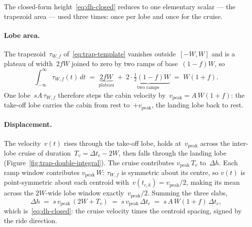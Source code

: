 \documentclass[manuscript,review,screen]{acmart}
\begin{document}
The closed-form height~\eqref{eq:dh-closed} reduces to one
elementary scalar — the trapezoid area — used three times: once
per lobe and once for the cruise.

\paragraph{Lobe area.}
The trapezoid~$\tau_{W,f}$ of~\eqref{eq:trap-template} vanishes
outside~$[-W,W]$ and is a plateau of width~$2fW$ joined to zero by
two ramps of base~$(1-f)W$, so
\begin{equation}
  \int_{-\infty}^{\infty}\!\tau_{W,f}(t)\,dt
   \;=\;\underbrace{2fW}_{\text{plateau}}
        \;+\;\underbrace{2\cdot\tfrac12(1-f)W}_{\text{two ramps}}
   \;=\;W(1+f).
  \label{eq:trap-area}
\end{equation}
One lobe~$sA\,\tau_{W,f}$ therefore steps the cabin velocity
by~$v_{\mathrm{peak}}\!=\!A\,W(1+f)$: the take-off lobe carries the
cabin from rest to~$+v_{\mathrm{peak}}$, the landing lobe back to rest.

\paragraph{Displacement.}
The velocity~$v(t)$ rises through the take-off lobe, holds
at~$v_{\mathrm{peak}}$ across the inter-lobe cruise of
duration~$T_v\!=\!\Delta t_c\!-\!2W$, then falls through the landing
lobe (Figure~\ref{fig:trap-double-integral}).  The cruise contributes
$v_{\mathrm{peak}}\,T_v$ to~$\Delta h$.  Each ramp window contributes
$v_{\mathrm{peak}}\,W$: $\tau_{W,f}$ is symmetric about its centre, so
$v(t)$ is point-symmetric about each centroid
with~$v(t_{c,k})\!=\!v_{\mathrm{peak}}/2$, making its mean across the
$2W$-wide lobe window exactly~$v_{\mathrm{peak}}/2$.  Summing the
three slabs,
\[
  \Delta h \;=\; s\,v_{\mathrm{peak}}\,(2W+T_v)
            \;=\; s\,v_{\mathrm{peak}}\,\Delta t_c
            \;=\; s\,A\,W(1+f)\,\Delta t_c,
\]
which is~\eqref{eq:dh-closed}: the cruise velocity times the centroid
spacing, signed by the ride direction.
\end{document}
